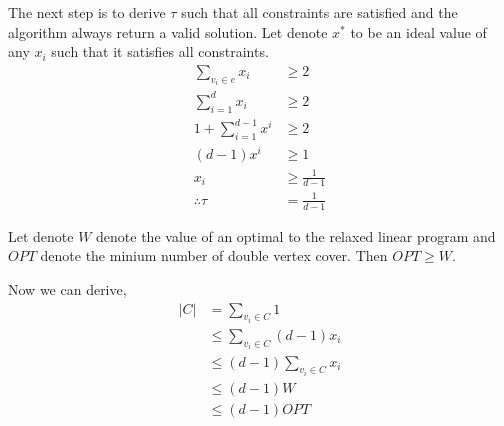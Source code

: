 The next step is to derive $\tau$ such that all constraints are satisfied and the algorithm always return a valid solution. Let denote
$x^*$ to be an ideal value of any $x_i$ such that it satisfies all constraints.
\begin{align*}
\sum\limits_{v_{i} \in e} x_i &\geq 2 \\
\sum\limits_{i=1}^d x_i &\geq 2 \\
1 + \sum\limits_{i=1}^{d-1} x^i &\geq 2 \\
(d-1) x^i &\geq 1 \\
x_i &\geq \frac{1}{d-1} \\
\therefore \tau &= \frac{1}{d-1}
\end{align*}

Let denote $W$ denote the value of an optimal to the relaxed linear program and $OPT$ denote the minium number of double vertex cover.
Then $OPT \geq W$.

Now we can derive,
\begin{align*}
    |C| &= \sum\limits_{v_i \in C} 1 \\
        &\leq \sum\limits_{v_i \in C} (d-1)x_i \\
        &\leq (d-1) \sum\limits_{v_i \in C} x_i \\
        &\leq (d-1)W \\
        &\leq (d-1)OPT \\
\end{align*}
